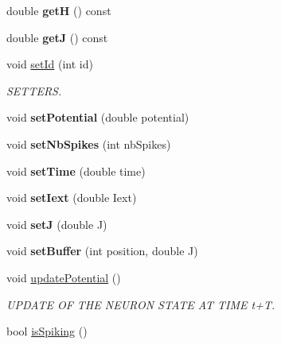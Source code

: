 \begin{DoxyCompactItemize}
\item 
\hypertarget{classNeuron_a93d421cadcab22e36ea13dd0cc32310b}{double {\bfseries get\-H} () const }\label{classNeuron_a93d421cadcab22e36ea13dd0cc32310b}

\item 
\hypertarget{classNeuron_a320ab48e220523371b266385c650e31f}{double {\bfseries get\-J} () const }\label{classNeuron_a320ab48e220523371b266385c650e31f}

\item 
\hypertarget{classNeuron_aefc6637d3b0a20669af3b7e92a7bf209}{void \hyperlink{classNeuron_aefc6637d3b0a20669af3b7e92a7bf209}{set\-Id} (int id)}\label{classNeuron_aefc6637d3b0a20669af3b7e92a7bf209}

\begin{DoxyCompactList}\small\item\em S\-E\-T\-T\-E\-R\-S. \end{DoxyCompactList}\item 
\hypertarget{classNeuron_aeb0bb5498270ef19067e9f3c0da07504}{void {\bfseries set\-Potential} (double potential)}\label{classNeuron_aeb0bb5498270ef19067e9f3c0da07504}

\item 
\hypertarget{classNeuron_a164953125030454bd5ef6c77b007ed8b}{void {\bfseries set\-Nb\-Spikes} (int nb\-Spikes)}\label{classNeuron_a164953125030454bd5ef6c77b007ed8b}

\item 
\hypertarget{classNeuron_a71e11de6c0cf3388c8055389001389a9}{void {\bfseries set\-Time} (double time)}\label{classNeuron_a71e11de6c0cf3388c8055389001389a9}

\item 
\hypertarget{classNeuron_ae1c8586330a226df3c50dbb1b0112eba}{void {\bfseries set\-Iext} (double Iext)}\label{classNeuron_ae1c8586330a226df3c50dbb1b0112eba}

\item 
\hypertarget{classNeuron_a2fadbcec4519684fc8b33de1ae6891f9}{void {\bfseries set\-J} (double J)}\label{classNeuron_a2fadbcec4519684fc8b33de1ae6891f9}

\item 
\hypertarget{classNeuron_a7c43f52b2add5c0091a00644d27cdc01}{void {\bfseries set\-Buffer} (int position, double J)}\label{classNeuron_a7c43f52b2add5c0091a00644d27cdc01}

\item 
void \hyperlink{classNeuron_ab521aac5bf7eb98555d0bb30ce7a4010}{update\-Potential} ()
\begin{DoxyCompactList}\small\item\em U\-P\-D\-A\-T\-E O\-F T\-H\-E N\-E\-U\-R\-O\-N S\-T\-A\-T\-E A\-T T\-I\-M\-E t+\-T. \end{DoxyCompactList}\item 
\hypertarget{classNeuron_af3892074a5a86866feb8bcc592e1ba35}{bool \hyperlink{classNeuron_af3892074a5a86866feb8bcc592e1ba35}{is\-Spiking} ()}\label{classNeuron_af3892074a5a86866feb8bcc592e1ba35}


\end{DoxyCompactItemize}
